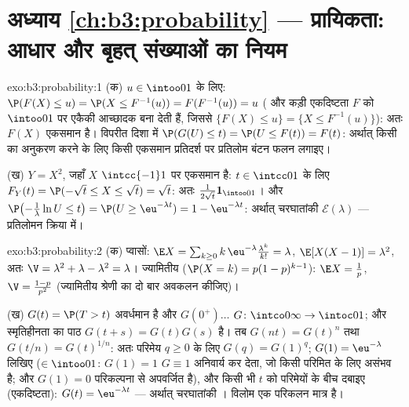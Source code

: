 \section*{अध्याय \ref{ch:b3:probability} --- प्रायिकता: आधार
और बृहत् संख्याओं का नियम}

\begin{solution}{exo:b3:probability:1}
(क) $u \in \intoo01$ के लिए: $\P(F(X) \leq u) = \P(X \leq
F^{-1}(u)) = F(F^{-1}(u)) = u$ ( और कड़ी एकदिष्टता
$F$ को $\intoo01$ पर एकैकी आच्छादक बना देती हैं, जिससे
$\{F(X) \leq u\} = \{X \leq F^{-1}(u)\}$): अतः $F(X)$
एकसमान है। विपरीत दिशा में $\P(G(U) \leq t) = \P(U \leq F(t))
= F(t)$: अर्थात् किसी  का अनुकरण करने के लिए किसी
एकसमान प्रतिदर्श पर प्रतिलोम बंटन फलन लगाइए।

(ख) $Y = X^2$, जहाँ $X$ $\intcc{-1}1$ पर एकसमान है: $t \in
\intcc01$ के लिए $F_Y(t) = \P(-\sqrt t \leq X \leq \sqrt t) =
\sqrt t$: अतः  $\frac1{2\sqrt t}\mathbf 1_{\intoo01}$।
और $\P\bigl(-\frac1\lambda\ln U \leq t\bigr) = \P(U \geq
\eu^{-\lambda t}) = 1 - \eu^{-\lambda t}$: अर्थात् चरघातांकी
$\mathcal E(\lambda)$ --- प्रतिलोमन क्रिया में।
\end{solution}

\begin{solution}{exo:b3:probability:2}
(क) प्वासों: $\E X = \sum_{k\geq0}k\,\eu^{-\lambda}
\frac{\lambda^k}{k!} = \lambda$, $\E[X(X-1)] = \lambda^2$,
अतः $\V = \lambda^2 + \lambda - \lambda^2 = \lambda$।
ज्यामितीय ($\P(X = k) = p(1-p)^{k-1}$): $\E X = \frac1p$, $\V
= \frac{1-p}{p^2}$ (ज्यामितीय श्रेणी का दो बार अवकलन कीजिए)।

(ख) $G(t) = \P(T > t)$ अवर्धमान है और $G(0^+)\dots$
$G \colon \intco0\infty \to \intoc01$; और स्मृतिहीनता का पाठ
$G(t + s) = G(t)G(s)$ है। तब $G(n t) = G(t)^n$ तथा $G(t/n) =
G(t)^{1/n}$: अतः परिमेय $q \geq 0$ के लिए $G(q) = G(1)^q$;
$G(1) = \eu^{-\lambda}$ लिखिए ($\in \intoo01$: $G(1) = 1$
$G \equiv 1$ अनिवार्य कर देता, जो किसी परिमित  के
लिए असंभव है; और $G(1) = 0$ परिकल्पना से अपवर्जित है), और
किसी भी $t$ को परिमेयों के बीच दबाइए (एकदिष्टता): $G(t) =
\eu^{-\lambda t}$ --- अर्थात् चरघातांकी । विलोम एक
परिकलन मात्र है।
\end{solution}

